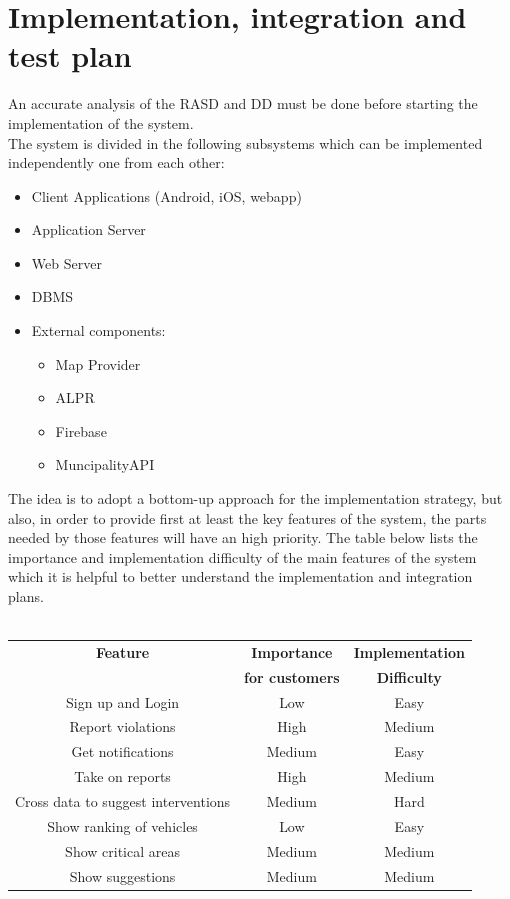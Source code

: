 \documentclass{article}
\begin{document}
\section{Implementation, integration and test plan}
\label{sec:ittp}
An accurate analysis of the RASD and DD must be done before starting the implementation of the system.\\
The system is divided in the following subsystems which can be implemented independently one from each other:
\begin{itemize}
	\item Client Applications (Android, iOS, webapp)
	\item Application Server
	\item Web Server
	\item DBMS
	\item External components:
	\begin{itemize}
		\item Map Provider
		\item ALPR
		\item Firebase
		\item MuncipalityAPI
	\end{itemize}
\end{itemize}
The idea is to adopt a bottom-up approach for the implementation strategy, but also, in order to provide first at least the key features of the system, the parts needed by those features will have an high priority.
The table below lists the importance and implementation difficulty of the main features of the system which it is helpful to better understand the implementation and integration plans.
\\ \\
\begin{tabular}{c|c|c}
\hline
\bf Feature & \bf Importance & \bf Implementation \\& \bf for customers & \bf Difficulty\\
\hline
\hline
Sign up and Login & Low & Easy\\
\hline
Report violations & High & Medium \\
\hline
Get notifications & Medium & Easy\\
\hline
Take on reports & High & Medium \\
\hline
Cross data to suggest interventions  & Medium & Hard\\
\hline
Show ranking of vehicles & Low & Easy\\
\hline
Show critical areas & Medium & Medium\\
\hline
Show suggestions & Medium & Medium\\
\hline
\end{tabular}
\end{document}
